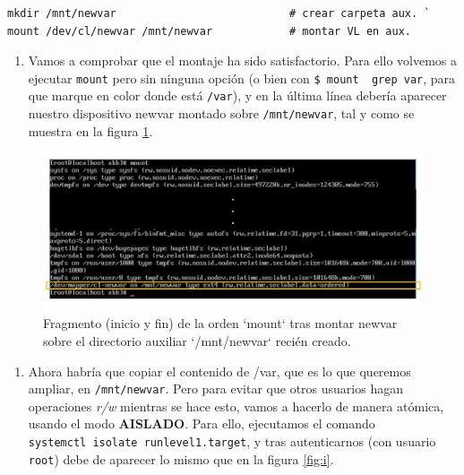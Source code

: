 \documentclass[
]{book}
\providecommand{\tightlist}{%
  \setlength{\itemsep}{0pt}\setlength{\parskip}{0pt}}
\begin{document}
\begin{verbatim}
mkdir /mnt/newvar                           # crear carpeta aux. ` 
mount /dev/cl/newvar /mnt/newvar            # montar VL en aux.
\end{verbatim}

\begin{enumerate}
\def\labelenumi{\arabic{enumi}.}
\setcounter{enumi}{8}
\tightlist
\item
  Vamos a comprobar que el montaje ha sido satisfactorio. Para ello volvemos a ejecutar \texttt{mount} pero sin ninguna opción (o bien con \texttt{\$\ mount\ \textbar{}\ grep\ var}, para que marque en color donde está \texttt{/var}), y en la última línea debería aparecer nuestro dispositivo newvar montado sobre \texttt{/mnt/newvar}, tal y como se muestra en la figura \ref{fig:h}.
\end{enumerate}

\begin{figure}

{\centering \includegraphics[width=0.8\linewidth]{images/h} 

}

\caption{Fragmento (inicio y fin) de la orden `mount` tras montar newvar sobre el directorio auxiliar `/mnt/newvar` recién creado.}\label{fig:h}
\end{figure}

\begin{enumerate}
\def\labelenumi{\arabic{enumi}.}
\setcounter{enumi}{9}
\tightlist
\item
  Ahora habría que copiar el contenido de /var, que es lo que queremos ampliar, en \texttt{/mnt/newvar}. Pero para evitar que otros usuarios hagan operaciones \emph{r/w} mientras se hace esto, vamos a hacerlo de manera atómica, usando el modo \textbf{AISLADO}. Para ello, ejecutamos el comando \texttt{systemctl\ isolate\ runlevel1.target}, y tras autenticarnos (con usuario \texttt{root}) debe de aparecer lo mismo que en la figura \ref{fig:i}.
\end{enumerate}
\end{document}
